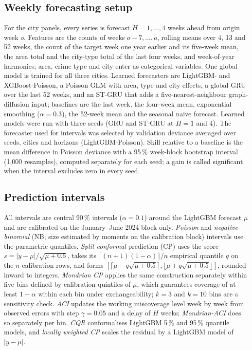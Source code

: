 \documentclass[preprint,12pt,authoryear]{elsarticle}
\begin{document}
\subsection{Weekly forecasting setup}\label{sec:weekly-setup}
For the city panels, every series is forecast $H=1,\dots,4$ weeks ahead from origin week $o$. Features are the counts of weeks $o-7,\dots,o$, rolling means over 4, 13 and 52 weeks, the count of the target week one year earlier and its five-week mean, the area total and the city-type total of the last four weeks, and week-of-year harmonics; area, crime type and city enter as categorical variables. One global model is trained for all three cities. Learned forecasters are LightGBM- and XGBoost-Poisson, a Poisson GLM with area, type and city effects, a global GRU over the last 52 weeks, and an ST-GRU that adds a five-nearest-neighbour graph-diffusion input; baselines are the last week, the four-week mean, exponential smoothing ($\alpha=0.3$), the 52-week mean and the seasonal naive forecast. Learned models were run with three seeds (GRU and ST-GRU at $H=1$ and 4). The forecaster used for intervals was selected by validation deviance averaged over seeds, cities and horizons (LightGBM-Poisson). Skill relative to a baseline is the mean difference in Poisson deviance with a 95\,\% week-block bootstrap interval (1{,}000 resamples), computed separately for each seed; a gain is called significant when the interval excludes zero in every seed.

\subsection{Prediction intervals}\label{sec:intervals}
All intervals are central 90\,\% intervals ($\alpha=0.1$) around the LightGBM forecast $\mu$ and are calibrated on the January--June 2024 block only. \emph{Poisson} and \emph{negative-binomial} (NB; size estimated by moments on the calibration block) intervals use the parametric quantiles. \emph{Split conformal} prediction (CP) uses the score $s=|y-\mu|/\sqrt{\mu+0.5}$, takes its $\lceil(n+1)(1-\alpha)\rceil/n$ empirical quantile $q$ on the $n$ calibration rows, and forms $[\lceil\mu-q\sqrt{\mu+0.5}\rceil,\lfloor\mu+q\sqrt{\mu+0.5}\rfloor]$, rounded inward to integers. \emph{Mondrian CP} applies the same construction separately within five bins defined by calibration quintiles of $\mu$, which guarantees coverage of at least $1-\alpha$ within each bin under exchangeability; $k=3$ and $k=10$ bins are a sensitivity check. \emph{ACI} \citep{gibbs2021aci} updates the working miscoverage level week by week from observed errors with step $\gamma=0.05$ and a delay of $H$ weeks; \emph{Mondrian-ACI} does so separately per bin. \emph{CQR} \citep{romano2019cqr} conformalises LightGBM 5\,\% and 95\,\% quantile models, and \emph{locally weighted CP} scales the residual by a LightGBM model of $|y-\mu|$.
\end{document}
